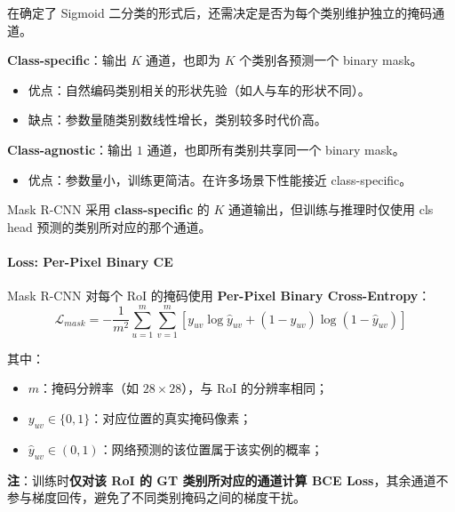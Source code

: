 在确定了 Sigmoid
二分类的形式后，还需决定是否为每个类别维护独立的掩码通道。

\textbf{Class-specific}：输出 \(K\) 通道，也即为 \(K\) 个类别各预测一个
binary mask。

\begin{itemize}
\tightlist
\item
  优点：自然编码类别相关的形状先验（如人与车的形状不同）。
\item
  缺点：参数量随类别数线性增长，类别较多时代价高。
\end{itemize}

\textbf{Class-agnostic}：输出 \(1\) 通道，也即所有类别共享同一个 binary
mask。

\begin{itemize}
\tightlist
\item
  优点：参数量小，训练更简洁。在许多场景下性能接近 class-specific。
\end{itemize}

Mask R-CNN 采用 \textbf{class-specific} 的 \(K\)
通道输出，但训练与推理时仅使用 cls head 预测的类别所对应的那个通道。

\paragraph{Loss: Per-Pixel Binary CE}\label{loss-per-pixel-binary-ce}

Mask R-CNN 对每个 RoI 的掩码使用 \textbf{Per-Pixel Binary
Cross-Entropy}： \[
\mathcal{L}_{mask}
= -\frac{1}{m^2} \sum_{u=1}^{m} \sum_{v=1}^{m}
\left[ y_{uv} \log \hat{y}_{uv} + (1 - y_{uv}) \log (1 - \hat{y}_{uv}) \right]
\]

其中：

\begin{itemize}
\tightlist
\item
  \(m\)：掩码分辨率（如 \(28 \times 28\)），与 RoI 的分辨率相同；
\item
  \(y_{uv}\in\{0,1\}\)：对应位置的真实掩码像素；
\item
  \(\hat{y}_{uv}\in(0,1)\)：网络预测的该位置属于该实例的概率；
\end{itemize}

\textbf{注}：训练时\textbf{仅对该 RoI 的 GT 类别所对应的通道计算 BCE
Loss}，其余通道不参与梯度回传，避免了不同类别掩码之间的梯度干扰。
